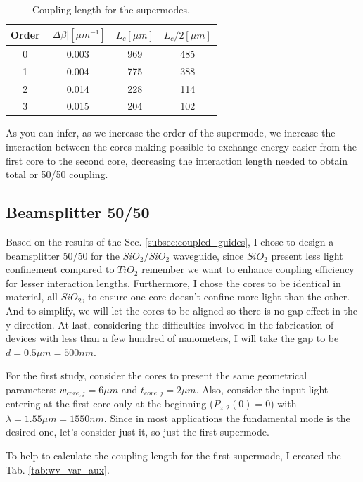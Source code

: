 \documentclass[a4paper,12pt]{article}
\begin{document}
\begin{table}[H]
    \centering
    \begin{tabular}{cccc}
        \toprule
        Order & $|\Delta \beta| [\mu m^{-1}]$ & $L_c [\mu m]$ & $L_{c}/2 [\mu m]$ \\
        \midrule
        0 & 0.003 & 969 & 485 \\     
        1 & 0.004 & 775 & 388 \\
        2 & 0.014 & 228 & 114 \\
        3 & 0.015 & 204 & 102 \\
        \bottomrule
    \end{tabular}
    \caption{Coupling length for the supermodes.}
    \label{tab:coupling_length}
\end{table}

As you can infer, as we increase the order of the supermode, we increase the interaction between the cores making possible to exchange energy easier from the first core to the second core, decreasing the interaction length needed to obtain total or 50/50 coupling.

\subsection{Beamsplitter 50/50}
\label{subsec:beamsplitter}

Based on the results of the Sec. \ref{subsec:coupled_guides}, I chose to design a beamsplitter 50/50 for the $SiO_2/SiO_2$ waveguide, since $SiO_2$ present less light confinement compared to $TiO_2$ \textemdash remember we want to enhance coupling efficiency for lesser interaction lengths. Furthermore, I chose the cores to be identical in material, all $SiO_2$, to ensure one core doesn't confine more light than the other. And to simplify, we will let the cores to be aligned so there is no gap effect in the y-direction. At last, considering the difficulties involved in the fabrication of devices with less than a few hundred of nanometers, I will take the gap to be $d = 0.5\mu m = 500nm$.

For the first study, consider the cores to present the same geometrical parameters: $w_{core, j} = 6\mu m$ and $t_{core, j} = 2\mu m$. Also, consider the input light entering at the first core only at the beginning ($P_{z,2}(0) = 0$) with $\lambda = 1.55\mu m = 1550nm$. Since in most applications the fundamental mode is the desired one, let's consider just it, so just the first supermode.

To help to calculate the coupling length for the first supermode, I created the Tab. \ref{tab:wv_var_aux}.
\end{document}
